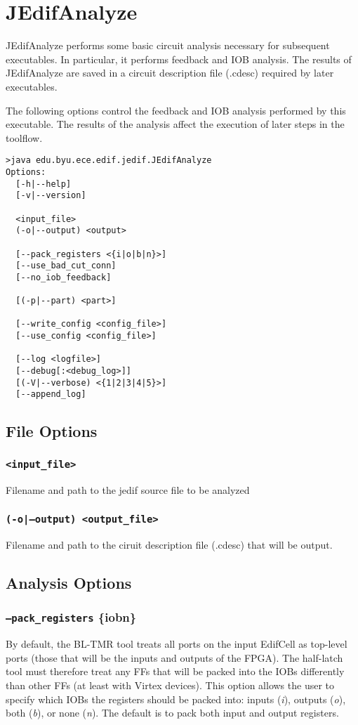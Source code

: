 \section{JEdifAnalyze}
JEdifAnalyze performs some basic circuit analysis necessary for
subsequent executables. In particular, it performs feedback and IOB
analysis. The results of JEdifAnalyze are saved in a circuit
description file (.cdesc) required by later executables.

The following options control the feedback and IOB analysis
performed by this executable. The results of the analysis
affect the execution of later steps in the toolflow.

\begin{verbatim}
>java edu.byu.ece.edif.jedif.JEdifAnalyze
Options:
  [-h|--help]
  [-v|--version]

  <input_file>
  (-o|--output) <output>

  [--pack_registers <{i|o|b|n}>]
  [--use_bad_cut_conn]
  [--no_iob_feedback]

  [(-p|--part) <part>]

  [--write_config <config_file>]
  [--use_config <config_file>]

  [--log <logfile>]
  [--debug[:<debug_log>]]
  [(-V|--verbose) <{1|2|3|4|5}>]
  [--append_log]
\end{verbatim}

\subsection{File Options}

\subsubsection{\texttt{<input\_file>}}
Filename and path to the jedif source file to be analyzed

\subsubsection{\texttt{(-o|--output) <output\_file>}}
Filename and path to the ciruit description file (.cdesc) that will be output.

\subsection{Analysis Options}
\subsubsection{\texttt{--pack\_registers} \{i\textbar o\textbar b\textbar n\}}
By default, the BL-TMR tool treats all ports on the input EdifCell as top-level
ports (those that will be the inputs and outputs of the FPGA). The half-latch 
tool must therefore treat any FFs that will be packed into the IOBs differently
than other FFs (at least with Virtex devices). This option allows the user to
specify which IOBs the registers should be packed into: inputs (\emph{i}),
outputs (\emph{o}), both (\emph{b}), or none (\emph{n}). The default is to pack
both input and output registers.


